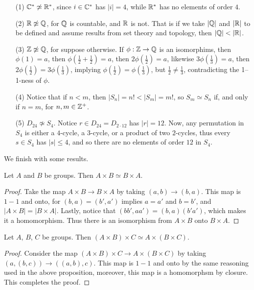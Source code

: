 \begin{example}\label{example_1.15}
  \begin{enumerate}
    \item[(1)] $\mathbb{C}^* \not\simeq \mathbb{R}^*$, since $i \in \mathbb{C}^*$ has $|i|=4$,
      while $\mathbb{R}^*$ has no elements of order  $4$.

    \item [(2)] $\mathbb{R} \not\simeq \mathbb{Q}$, for  $\mathbb{Q}$ is countable, and  $\mathbb{R}$ is
      not. That is if we take  $|\mathbb{Q}|$ and $|\mathbb{R}|$ to be defined and
      assume results from set theory and topology, then $|\Q|<|\R|$.

    \item[(3)] $\mathbb{Z} \not\simeq \mathbb{Q}$, for suppose otherwise. If  $\phi:\mathbb{Z}
      \rightarrow \mathbb{Q}$ is an isomorphims, then $\phi(1)=a$, then
      $\phi(\frac{1}{2}+\frac{1}{2})=a$, then $2\phi(\frac{1}{2})=a$,
      likewise $3\phi(\frac{1}{3})=a$, then $2\phi(\frac{1}{2})=
      3\phi(\frac{1}{3})$, implying $\phi(\frac{1}{2})=\phi(\frac{1}{3})$,
      but $\frac{1}{2} \neq \frac{1}{3}$, contradicting the 1--1-ness of
      $\phi$.

    \item[(4)] Notice that if $n<m$, then  $|S_n|=n!<|S_m|=m!$, so
      $S_m \simeq S_n$ if, and only if  $n=m$, for $n,m \in \mathbb{Z}^+$.

    \item[(5)] $D_{24} \not\simeq S_4$. Notice $r \in D_{24}=D_{2 \cdot 12}$
      has $|r|=12$. Now, any permutation in $S_4$ is either a
      $4$-cycle, a  $3$-cycle, or a product of two  $2$-cycles, thus every
      $s \in S_4$ has $|s| \leq 4$, and so there are no elements of
      order $12$ in  $S_4$.
  \end{enumerate}
\end{example}

We finish with some results.

\begin{proposition}\label{proposition_1.5.5}
  Let $A$ and  $B$ be groups. Then  $A \times B \simeq B \times A$.
\end{proposition}
\begin{proof}
  Take the map $A \times B \rightarrow B \times A$ by taking $(a,b)
  \rightarrow (b,a)$. This map is $1-1$ and onto, for $(b,a)=(b',a')$ implies
  $a=a'$ and  $b=b'$, and  $|A \times B|=|B \times A|$. Lastly,
  notice that $(bb',aa')=(b,a)(b'a')$, which makes it a homomorphism. Thus
  there is an isomorphism from  $A \times B$ onto  $B \times A$.
\end{proof}

\begin{proposition}\label{proposition_1.5.7}
  Let $A$,  $B$,  $C$ be groups. Then  $(A \times B) \times C \simeq A \times
  (B \times C)$.
\end{proposition}
\begin{proof}
  Consider the map $(A \times B) \times C \rightarrow A \times (B \times C)$
  by taking $(a,(b,c)) \rightarrow ((a,b),c)$. This map is $1-1$ and onto by
  the same reasoning used in the above proposition, moreover, this map is a
  homomorphsm by closure. This completes the proof.
\end{proof}
